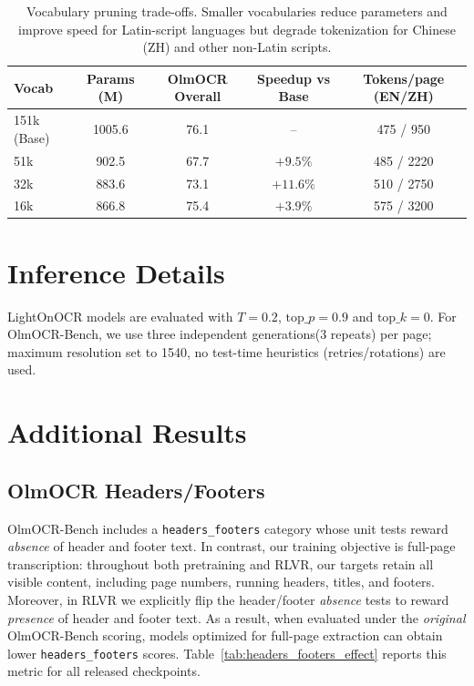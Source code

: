 \documentclass{article}
\begin{document}
\begin{table}[h]
\centering
\small
\setlength{\tabcolsep}{4pt}
\begin{tabular}{lcccc}
\toprule
\textbf{Vocab} & \textbf{Params (M)} & \textbf{OlmOCR Overall} & \textbf{Speedup vs Base} & \textbf{Tokens/page (EN/ZH)} \\
\midrule
151k (Base) & 1005.6 & 76.1 & -- & 475 / 950 \\
51k & 902.5 & 67.7 & $+9.5\%$ & 485 / 2220 \\
32k & 883.6 & 73.1 & $+11.6\%$ & 510 / 2750 \\
16k & 866.8 & 75.4 & $+3.9\%$ & 575 / 3200 \\
\bottomrule
\end{tabular}
\caption{Vocabulary pruning trade-offs. Smaller vocabularies reduce parameters and improve speed for Latin-script languages but degrade tokenization for Chinese (ZH) and other non-Latin scripts.}
\label{tab:vocab_pruning}
\end{table}



\section{Inference Details}
\label{app:inference_details}
LightOnOCR models are evaluated with $T=0.2$, $\mathrm{top}\_p=0.9$ and $\mathrm{top}\_k=0$.
For OlmOCR-Bench, we use three independent generations(3 repeats) per page; maximum resolution set to 1540, no test-time heuristics (retries/rotations) are used.


\section{Additional Results}
\subsection{OlmOCR Headers/Footers}
\label{app:headers_footers}
OlmOCR-Bench includes a \texttt{headers\_footers} category whose unit tests reward \emph{absence} of header and footer text. In contrast, our training objective is full-page transcription: throughout both pretraining and RLVR, our targets retain all visible content, including page numbers, running headers, titles, and footers. Moreover, in RLVR we explicitly flip the header/footer \emph{absence} tests to reward \emph{presence} of header and footer text. As a result, when evaluated under the \emph{original} OlmOCR-Bench scoring, models optimized for full-page extraction can obtain lower \texttt{headers\_footers} scores. Table~\ref{tab:headers_footers_effect} reports this metric for all released checkpoints.
\end{document}
